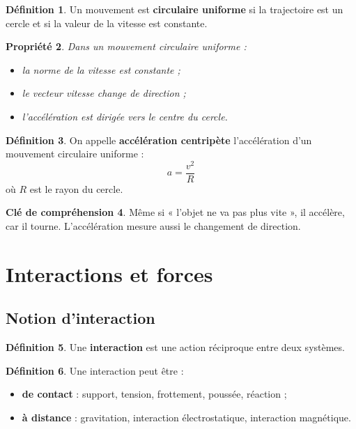 \documentclass[11pt,a4paper]{article}
\theoremstyle{definition}
\newtheorem{definition}{Définition}[section]
\newtheorem{interpretation}[definition]{Clé de compréhension}
\theoremstyle{plain}
\newtheorem{propriete}[definition]{Propriété}
\theoremstyle{remark}
\begin{document}
\begin{definition}
Un mouvement est \textbf{circulaire uniforme} si la trajectoire est un cercle et si la valeur de la vitesse est constante.
\end{definition}

\begin{propriete}
Dans un mouvement circulaire uniforme :
\begin{itemize}
    \item la norme de la vitesse est constante ;
    \item le vecteur vitesse change de direction ;
    \item l'accélération est dirigée vers le centre du cercle.
\end{itemize}
\end{propriete}

\begin{definition}
On appelle \textbf{accélération centripète} l'accélération d'un mouvement circulaire uniforme :
\[
a=\frac{v^2}{R}
\]
où $R$ est le rayon du cercle.
\end{definition}

\begin{interpretation}
Même si « l'objet ne va pas plus vite », il accélère, car il tourne.  
L'accélération mesure aussi le changement de direction.
\end{interpretation}

\section{Interactions et forces}

\subsection{Notion d'interaction}

\begin{definition}
Une \textbf{interaction} est une action réciproque entre deux systèmes.
\end{definition}

\begin{definition}
Une interaction peut être :
\begin{itemize}
    \item \textbf{de contact} : support, tension, frottement, poussée, réaction ;
    \item \textbf{à distance} : gravitation, interaction électrostatique, interaction magnétique.
\end{itemize}
\end{definition}
\end{document}
